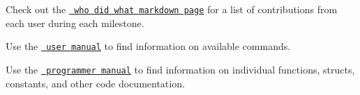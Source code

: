 Check out the \href{https://github.com/Soup-tech/MAMA/blob/main/WhoDidWhat.md}{\texttt{ who did what markdown page}} for a list of contributions from each user during each milestone.

Use the \href{https://github.com/Soup-tech/MAMA/blob/main/docs/MAMA\%20User\%20Manual.pdf}{\texttt{ user manual}} to find information on available commands.

Use the \href{https://github.com/Soup-tech/MAMA/blob/main/docs/MAMA.pdf}{\texttt{ programmer manual}} to find information on individual functions, structs, constants, and other code documentation. 
